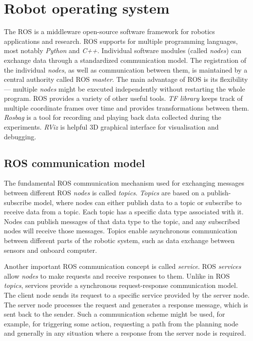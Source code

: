 \section{Robot operating system}
The \ac{ROS} \cite{ROS} is a middleware open-source software framework for robotics applications and research.
\ac{ROS} supports for multiple programming languages, most notably \textit{Python} and \textit{C++}.
Individual software modules (called \textit{nodes}) can exchange data through a standardized communication model.
The registration of the individual \textit{nodes}, as well as communication between them, is maintained by a central authority called \ac{ROS} \textit{master}.
The main advantage of \ac{ROS} is its flexibility --- multiple \textit{nodes} might be executed independently without restarting the whole program.
\ac{ROS} provides a variety of other useful tools.
\textit{TF library} keeps track of multiple coordinate frames over time and provides transformations between them.
\textit{Rosbag} is a tool for recording and playing back data collected during the experiments.
\textit{RViz} is helpful 3D graphical interface for visualisation and debugging.

\subsection{ROS communication model}
The fundamental \ac{ROS} communication mechanism used for exchanging messages between different \ac{ROS} \textit{nodes} is called \textit{topics}.
\textit{Topics} are based on a publish-subscribe model, where nodes can either publish data to a topic or subscribe to receive data from a topic. 
Each topic has a specific data type associated with it.
Nodes can publish messages of that data type to the topic, and any subscribed nodes will receive those messages.
Topics enable asynchronous communication between different parts of the robotic system, such as data exchange between sensors and onboard computer.

Another important \ac{ROS} communication concept is called \textit{service}.
\ac{ROS} \textit{services} allow \textit{nodes} to make requests and receive responses to them.
Unlike in \ac{ROS} \textit{topics}, services provide a synchronous request-response communication model.
The client node sends its request to a specific service provided by the server node.
The server node processes the request and generates a response message, which is sent back to the sender.
Such a communication scheme might be used, for example, for triggering some action, requesting a path from the planning node and generally in any situation where a response from the server node is required.

